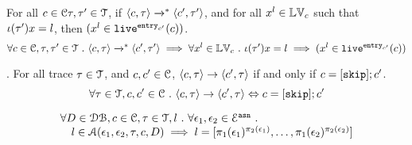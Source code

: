 %
\begin{lem}
\label{lem:inv_live}
For all $c \in \mathcal{C} \mathtt{\tau}, \mathtt{\tau}' \in \mathcal{T} $, if 
$\langle c, \mathtt{\tau} \rangle \xrightarrow{}^* \langle c', \mathtt{\tau}' \rangle$,
and for all $x^l \in \mathbb{LV}_c$ such that 
$\iota(\mathtt{\tau}') x = l $, then $(x^l \in \mathtt{live}^{\mathtt{entry}_{c'}}(c))$.
%
\[
	\forall c \in \mathcal{C} , \mathtt{\tau}, \mathtt{\tau}' \in \mathcal{T} ~.~
	\langle c, \mathtt{\tau} \rangle \xrightarrow{}^* \langle c', \mathtt{\tau}' \rangle
	\implies
	\forall x^l \in \mathbb{LV}_c ~.~ \iota(\mathtt{\tau}') x = l \implies (x^l \in \mathtt{live}^{\mathtt{entry}_{c'}}(c))
\]
\end{lem}
%
\begin{lem}.
\label{lem:inv_skip}
For all trace $\mathtt{\tau}\in \mathcal{T}$, and $c, c' \in \mathcal{C}$,  
$\langle c, \mathtt{\tau} \rangle \rightarrow \langle c', \mathtt{\tau} \rangle$ if and only if $c = [\mathtt{skip}];c'$. 
\[
	\forall \mathtt{\tau}\in \mathcal{T}, c, c' \in \mathcal{C} ~.~
	\langle c, \mathtt{\tau} \rangle \rightarrow \langle c', \mathtt{\tau} \rangle
	\Leftrightarrow 
	c = [\mathtt{skip}];c'
\]
\end{lem}
%
%
\begin{lem}
\label{lem:inv_alg1}
\[
\begin{array}{l}
    \forall D \in \mathcal{DB} , c \in \mathcal{C}, \mathtt{\tau} \in \mathcal{T}, l ~.~ \forall \mathtt{\epsilon}_1, \mathtt{\epsilon}_2 \in \mathcal{E}^{\mathtt{{asn}}} ~.~
  \\ \quad 
 l\in \mathcal{A}(\mathtt{\epsilon}_1, \mathtt{\epsilon}_2, \mathtt{\tau}, c, D)  \implies  l = [\pi_1(\mathtt{\epsilon}_1)^{\pi_2(\mathtt{\epsilon}_1)},\ldots, \pi_1(\mathtt{\epsilon}_2)^{\pi_2(\mathtt{\epsilon}_2)}]
\end{array}
\]
\end{lem}
